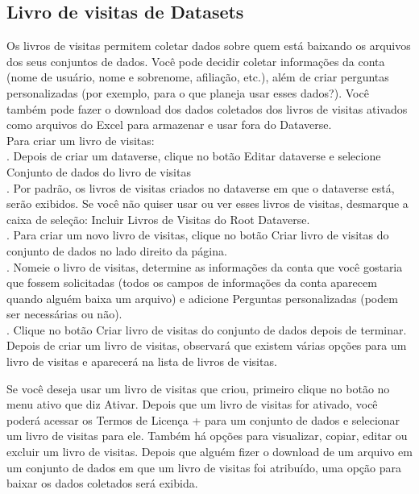 \documentclass[12pt,hidelinks]{article}
\begin{document}
    \subsection{Livro de visitas de Datasets}
    
\qquad Os livros de visitas permitem coletar dados sobre quem está baixando os arquivos dos seus conjuntos de dados. Você pode decidir coletar informações da conta (nome de usuário, nome e sobrenome, afiliação, etc.), além de criar perguntas personalizadas (por exemplo, para o que planeja usar esses dados?). Você também pode fazer o download dos dados coletados dos livros de visitas ativados como arquivos do Excel para armazenar e usar fora do Dataverse.\\

Para criar um livro de visitas:\\

. Depois de criar um dataverse, clique no botão Editar dataverse e selecione Conjunto de dados do livro de visitas\\

. Por padrão, os livros de visitas criados no dataverse em que o dataverse está, serão exibidos. Se você não quiser usar ou ver esses livros de visitas, desmarque a caixa de seleção: Incluir Livros de Visitas do Root Dataverse.\\

. Para criar um novo livro de visitas, clique no botão Criar livro de visitas do conjunto de dados no lado direito da página.\\

. Nomeie o livro de visitas, determine as informações da conta que você gostaria que fossem solicitadas (todos os campos de informações da conta aparecem quando alguém baixa um arquivo) e adicione Perguntas personalizadas (podem ser necessárias ou não).\\

. Clique no botão Criar livro de visitas do conjunto de dados depois de terminar.\\

Depois de criar um livro de visitas, observará que existem várias opções para um livro de visitas e aparecerá na lista de livros de visitas.

Se você deseja usar um livro de visitas que criou, primeiro clique no botão no menu ativo que diz Ativar. Depois que um livro de visitas for ativado, você poderá acessar os Termos de Licença + para um conjunto de dados e selecionar um livro de visitas para ele.
Também há opções para visualizar, copiar, editar ou excluir um livro de visitas.
Depois que alguém fizer o download de um arquivo em um conjunto de dados em que um livro de visitas foi atribuído, uma opção para baixar os dados coletados será exibida.
    
\end{document}
